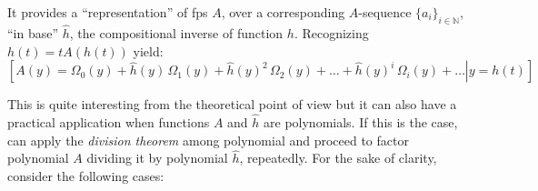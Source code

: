 It provides a ``representation'' of \ac{fps} $A$, over a corresponding
$A$-sequence $\lbrace a_{i}\rbrace_{i\in\mathbb{N}}$, ``in base'' $\hat{h}$, 
the compositional inverse of function $h$.  Recognizing $h(t)=tA(h(t))$ yield:
\begin{displaymath}
    \left.\left[
        A(y) =  \Omega_{0}(y) + 
        \hat{h}(y)\,\Omega_{1}(y) + \hat{h}(y)^{2}\,\Omega_{2}(y) + \ldots +
        \hat{h}(y)^{i}\,\Omega_{i}(y) + \ldots
        \right| y = h(t) \right]
\end{displaymath}

This is quite interesting from the theoretical point of 
view but it can also have a practical application
when functions $A$ and $\hat{h}$ are polynomials. If this is the case,
can apply the \emph{division theorem} among polynomial and 
proceed to factor polynomial $A$ dividing it by polynomial $\hat{h}$,
repeatedly. For the sake of clarity, consider the following cases:

